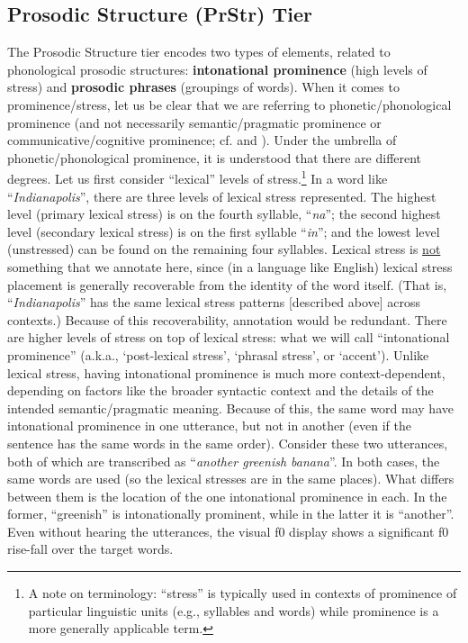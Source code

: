 \documentclass[11pt, twoside]{memoir}
\def\langtext#1{\textit{#1}}
\begin{document}
\subsection{Prosodic Structure (PrStr) Tier}\label{sec:prosodic-structure-prstr}
The Prosodic Structure tier encodes two types of elements, related to phonological prosodic structures: \textbf{intonational prominence} (high levels of stress) and \textbf{prosodic phrases} (groupings of words). When it comes to prominence\slash stress, let us be clear that we are referring to phonetic\slash phonological prominence (and not necessarily semantic\slash pragmatic prominence or communicative\slash cognitive prominence; cf. \citealt{gussenhoven15} and \citealt{wagner-15}). Under the umbrella of phonetic\slash phonological prominence, it is understood that there are different degrees. Let us first consider “lexical” levels of stress.\footnote{A note on terminology: “stress” is typically used in contexts of prominence of particular linguistic units (e.g., syllables and words) while prominence is a more generally applicable term.} In a word like “\langtext{Indianapolis}”, there are three levels of lexical stress represented. The highest level (primary lexical stress) is on the fourth syllable, “\langtext{na}”; the second highest level (secondary lexical stress) is on the first syllable “\langtext{in}”; and the lowest level (unstressed) can be found on the remaining four syllables. Lexical stress is \uline{not} something that we annotate here, since (in a language like English) lexical stress placement is generally recoverable from the identity of the word itself. (That is, “\langtext{Indianapolis}” has the same lexical stress patterns [described above] across contexts.) Because of this recoverability, annotation would be redundant.
There are higher levels of stress on top of lexical stress: what we will call “intonational prominence” (a.k.a., ‘post-lexical stress’, ‘phrasal stress’, or ‘accent’). Unlike lexical stress, having intonational prominence is much more context-dependent, depending on factors like the broader syntactic context and the details of the intended semantic\slash pragmatic meaning. Because of this, the same word may have intonational prominence in one utterance, but not in another (even if the sentence has the same words in the same order).
Consider these two utterances, both of which are transcribed as “\langtext{another greenish banana}”. In both cases, the same words are used (so the lexical stresses are in the same places). What differs between them is the location of the one intonational prominence in each. In the former, “greenish” is intonationally prominent, while in the latter it is “another”. Even without hearing the utterances, the visual f0 display shows a significant f0 rise-fall over the target words. 
\end{document}
